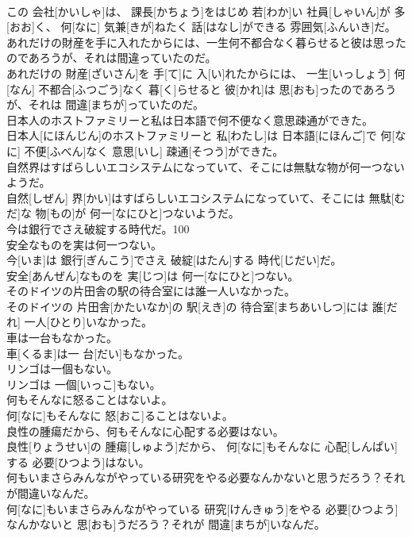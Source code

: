\documentclass[8pt]{extreport}
\begin{document}
\begin{CJK}{UTF8}{min}
\\	この 会社[かいしゃ]は、 課長[かちょう]をはじめ 若[わか]い 社員[しゃいん]が 多[おお]く、 何[なに] 気兼[きが]ねたく 話[はなし]ができる 雰囲気[ふんいき]だ。
\\	あれだけの財産を手に入れたからには、一生何不都合なく暮らせると彼は思ったのであろうが、それは間違っていたのだ。	
\\	あれだけの 財産[ざいさん]を 手[て]に 入[い]れたからには、 一生[いっしょう] 何[なん] 不都合[ふつごう]なく 暮[く]らせると 彼[かれ]は 思[おも]ったのであろうが、それは 間違[まちが]っていたのだ。
\\	日本人のホストファミリーと私は日本語で何不便なく意思疎通ができた。	
\\	日本人[にほんじん]のホストファミリーと 私[わたし]は 日本語[にほんご]で 何[なに] 不便[ふべん]なく 意思[いし] 疎通[そつう]ができた。
\\	自然界はすばらしいエコシステムになっていて、そこには無駄な物が何一つないようだ。	
\\	自然[しぜん] 界[かい]はすばらしいエコシステムになっていて、そこには 無駄[むだ]な 物[もの]が 何一[なにひと]つないようだ。
\\	今は銀行でさえ破綻する時代だ。100
\\	安全なものを実は何一つない。	
\\	今[いま]は 銀行[ぎんこう]でさえ 破綻[はたん]する 時代[じだい]だ。 
\\	安全[あんぜん]なものを 実[じつ]は 何一[なにひと]つない。
\\	そのドイツの片田舎の駅の待合室には誰一人いなかった。	
\\	そのドイツの 片田舎[かたいなか]の 駅[えき]の 待合室[まちあいしつ]には 誰[だれ] 一人[ひとり]いなかった。
\\	車は一台もなかった。	
\\	車[くるま]は一 台[だい]もなかった。
\\	リンゴは一個もない。	
\\	リンゴは 一個[いっこ]もない。
\\	何もそんなに怒ることはないよ。	
\\	何[なに]もそんなに 怒[おこ]ることはないよ。
\\	良性の腫瘍だから、何もそんなに心配する必要はない。	
\\	良性[りょうせい]の 腫瘍[しゅよう]だから、 何[なに]もそんなに 心配[しんぱい]する 必要[ひつよう]はない。
\\	何もいまさらみんながやっている研究をやる必要なんかないと思うだろう？それが間違いなんだ。	
\\	何[なに]もいまさらみんながやっている 研究[けんきゅう]をやる 必要[ひつよう]なんかないと 思[おも]うだろう？それが 間違[まちが]いなんだ。

\end{CJK}
\end{document}

